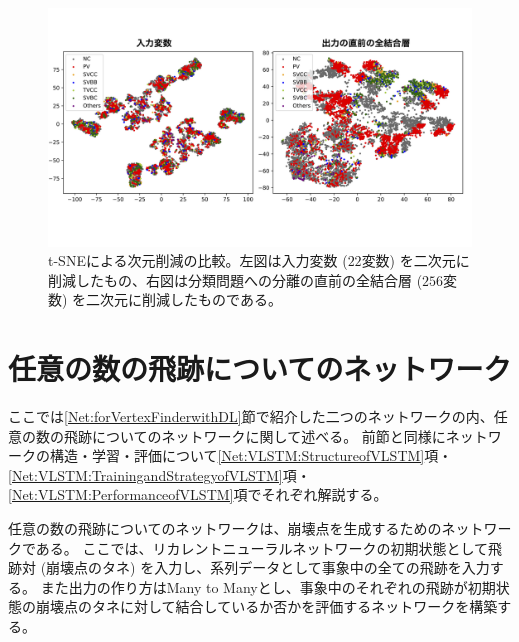 \begin{figure}[htbp]
 \centering
 \includegraphics[width=1.0\textwidth]{Figure/3Networks/3-3-3-3tSNE.png}
 \caption[t-SNEによる次元削減の比較]{t-SNEによる次元削減の比較。左図は入力変数 ($22$変数) を二次元に削減したもの、右図は分類問題への分離の直前の全結合層 ($256$変数) を二次元に削減したものである。}
 \label{3-3-3-3tSNE}
\end{figure}


\section{任意の数の飛跡についてのネットワーク} \label{Net:VertexLSTM}

ここでは\ref{Net:forVertexFinderwithDL}節で紹介した二つのネットワークの内、任意の数の飛跡についてのネットワークに関して述べる。
前節と同様にネットワークの構造・学習・評価について\ref{Net:VLSTM:StructureofVLSTM}項・\ref{Net:VLSTM:TrainingandStrategyofVLSTM}項・\ref{Net:VLSTM:PerformanceofVLSTM}項でそれぞれ解説する。

任意の数の飛跡についてのネットワークは、崩壊点を生成するためのネットワークである。
ここでは、リカレントニューラルネットワークの初期状態として飛跡対 (崩壊点のタネ) を入力し、系列データとして事象中の全ての飛跡を入力する。
また出力の作り方はMany to Manyとし、事象中のそれぞれの飛跡が初期状態の崩壊点のタネに対して結合しているか否かを評価するネットワークを構築する。


